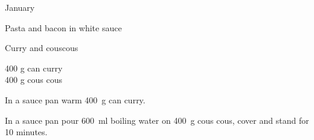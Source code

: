 \begin{menu}{January}
\begin{recipe}{2}{Pasta and bacon in white sauce}
\begin{instructions}
    \end{instructions}
    \end{recipe}%
  
    \begin{recipe}{1}{Curry and couscous}%
    
		\begin{ingredients}
		400 g can curry  \\
	400 g cous cous  \\
	
		\end{ingredients}
	
    \begin{instructions}
    \item 
        In a sauce pan warm
        400~g  can curry.
      \item 
      In a
      sauce pan pour 600~ml  boiling water
      on 400~g  cous cous, cover and
      stand for 10 minutes.
    
    \end{instructions}
    \end{recipe}%
  
    \clearpage
    \end{menu}
	
